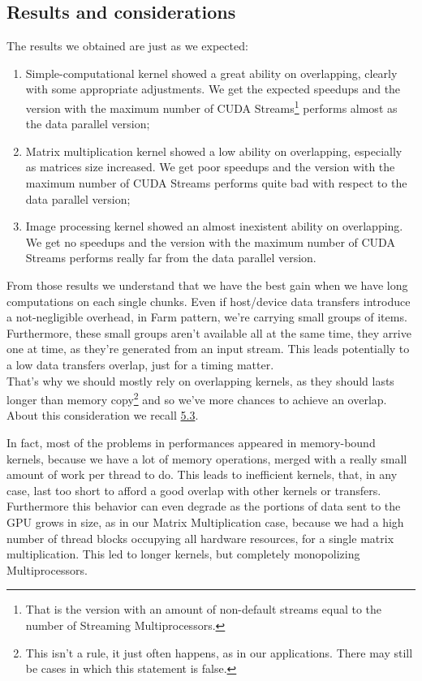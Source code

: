  \subsection{Results and considerations}
 The results we obtained are just as we expected:
 \begin{enumerate}
 	\item Simple-computational kernel showed a great ability on overlapping, clearly with some appropriate adjustments. We get the expected speedups and the version with the maximum number of CUDA Streams\footnote{That is the version with an amount of non-default streams equal to the number of Streaming Multiprocessors.} performs almost as the data parallel version;
 	
 	
 	
 	\item Matrix multiplication kernel showed a low ability on overlapping, especially as matrices size increased. We get poor speedups and the version with the maximum number of CUDA Streams performs quite bad with respect to the data parallel version;
 	
 	
 	
 	\item Image processing kernel showed an almost  inexistent ability on overlapping. We get no speedups and the version with the maximum number of CUDA Streams performs really far from the data parallel version.
 \end{enumerate}
 From those results we understand that we have the best gain when we have long computations on each single chunks. Even if host/device data transfers introduce a not-negligible overhead, in Farm pattern, we're carrying small groups of items.\\ Furthermore, these small groups aren't available all at the same time, they arrive one at time, as they're generated from an input stream.
 This leads potentially to a low data transfers overlap, just for a timing matter.\\ 
 That's why we should mostly rely on overlapping kernels, as they should lasts longer than memory copy\footnote{This isn't a rule, it just often happens, as in our applications. There may still be cases in which this statement is false.} and so we've more chances to achieve an overlap.\\
 About this consideration we recall \hyperref[fig:cosprofiling]{5.3}.
 
 In fact, most of the problems in performances appeared in memory-bound kernels, because we have a lot of memory operations, merged with a really small amount of work per thread to do. This leads to inefficient kernels, that, in any case, last too short to afford a good overlap with other kernels or transfers.\\
 Furthermore this behavior can even degrade as the portions of data sent to the GPU grows in size, as in our Matrix Multiplication case, because we had a high number of thread blocks occupying all hardware resources, for a single matrix multiplication. This led to longer kernels, but completely monopolizing Multiprocessors. \\
 

